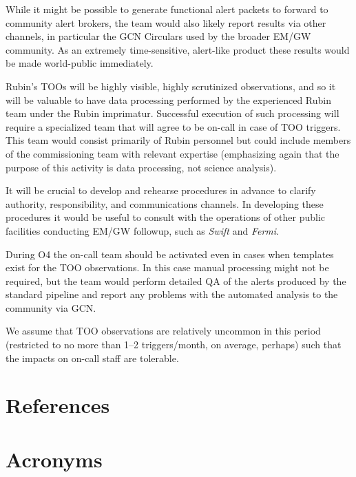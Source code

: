 \documentclass[DM,authoryear,toc]{lsstdoc}
\begin{document}
While it might be possible to generate functional alert packets to forward to community alert brokers, the team would also likely report results via other channels, in particular the GCN Circulars used by the broader EM/GW community.
As an extremely time-sensitive, alert-like product these results would be made world-public immediately.

Rubin's TOOs will be highly visible, highly scrutinized observations, and so it will be valuable to have data processing performed by the experienced Rubin team under the Rubin imprimatur.
Successful execution of such processing will require a specialized team that will agree to be on-call in case of TOO triggers.
This team would consist primarily of Rubin personnel but could include members of the commissioning team with relevant expertise (emphasizing again that the purpose of this activity is data processing, not science analysis).

It will be crucial to develop and rehearse procedures in advance to clarify authority, responsibility, and communications channels. 
In developing these procedures it would be useful to consult with the operations of other public facilities conducting EM/GW followup, such as \textit{Swift} and \textit{Fermi}.

During O4 the on-call team should be activated even in cases when templates exist for the TOO observations.
In this case manual processing might not be required, but the team would perform detailed QA of the alerts produced by the standard pipeline and report any problems with the automated analysis to the community via GCN.

We assume that TOO observations are relatively uncommon in this period (restricted to no more than 1--2 triggers/month, on average, perhaps) such that the impacts on on-call staff are tolerable.  


\appendix
\section{References} \label{sec:bib}
\renewcommand{\refname}{} %


\section{Acronyms} \label{sec:acronyms}

\end{document}
